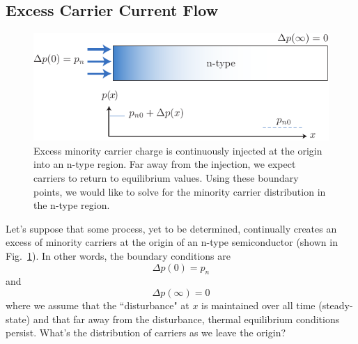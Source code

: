\subsection{Excess Carrier Current Flow}
\begin{figure}[tb]
\begin{center}
\includegraphics[width=.75\columnwidth]{excess_charge_inject}
\end{center}
\caption{Excess minority carrier charge is continuously injected at the origin into an n-type region.  Far away from the injection, we expect carriers to return to equilibrium values.  Using these boundary points, we would like to solve for the minority carrier distribution in the n-type region.} \label{fig:excess_charge_inject}
\end{figure}
 
Let's suppose that some process, yet to be determined, continually creates an excess of minority carriers at the origin of an n-type semiconductor (shown in Fig.~\ref{fig:excess_charge_inject}).  In other words, the boundary conditions are
\begin{equation}
	\Delta p(0) = p_{n}
\end{equation}	
and
\begin{equation}
	\Delta p(\infty) = 0
\end{equation}	
where we assume that the ``disturbance" at $x$ is maintained over all time (steady-state) and that far away from the disturbance, thermal equilibrium conditions persist.  What's the distribution of carriers as we leave the origin?  

